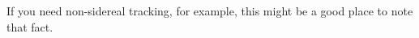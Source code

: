 \begin{configuration}
\filters{}
\order{}
\crossdisperser{}       
\slit{}
\multislit{}            
\cable{}
\corrector{}            
\collimator{}             
\adc{}
\end{configuration}

\specialrequest
If you need non-sidereal tracking, for example, this might be a good
place to note that fact.




%




